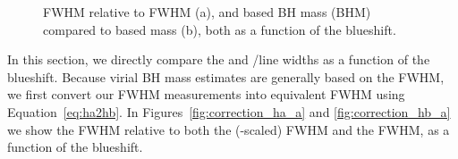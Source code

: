 \begin{figure}
    \captionsetup[subfigure]{labelformat=empty}
    \centering
    \subfloat[\label{fig:correction_hb_a}]{}
    \subfloat[\label{fig:correction_hb_b}]{}
    \caption[{ FWHM relative to \hb FWHM and  based BH mass compared to \hb based mass, both as a function of the  blueshift.}]{ FWHM relative to \hb FWHM (a), and  based BH mass (BHM) compared to \hb based mass (b), both as a function of the  blueshift.}
    \label{fig:correction_hb}
\end{figure}

In this section, we directly compare the  and \hans/\hb line widths as a function of the  blueshift.
Because virial BH mass estimates are generally based on the \hb FWHM, we first convert our \ha FWHM measurements into equivalent \hb FWHM using Equation~\ref{eq:ha2hb}.
In Figures~\ref{fig:correction_ha_a} and \ref{fig:correction_hb_a} we show the  FWHM relative to both the (\hbns-scaled) \ha FWHM and the \hb FWHM, as a function of the  blueshift.

